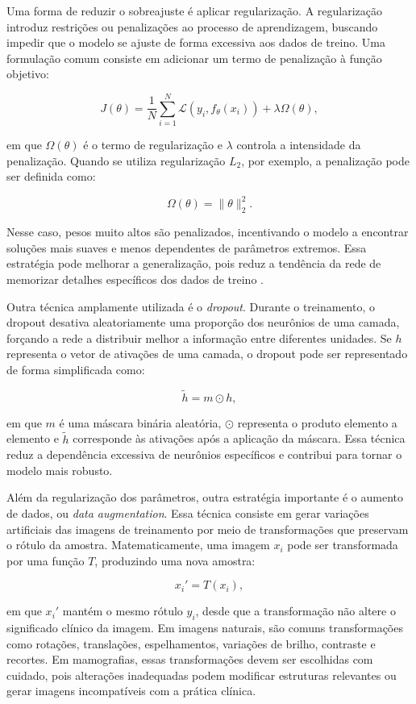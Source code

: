 \documentclass[
    12pt,
    openright,
    oneside,
    a4paper,
    english,
    brazil
]{abntex2}
\begin{document}
Uma forma de reduzir o sobreajuste é aplicar regularização. A regularização introduz restrições ou penalizações ao processo de aprendizagem, buscando impedir que o modelo se ajuste de forma excessiva aos dados de treino. Uma formulação comum consiste em adicionar um termo de penalização à função objetivo:

\[
J(\theta) =
\frac{1}{N}
\sum_{i=1}^{N}
\mathcal{L}(y_i, f_{\theta}(x_i))
+
\lambda \Omega(\theta),
\]

em que \(\Omega(\theta)\) é o termo de regularização e \(\lambda\) controla a intensidade da penalização. Quando se utiliza regularização \(L_2\), por exemplo, a penalização pode ser definida como:

\[
\Omega(\theta) = \|\theta\|_2^2.
\]

Nesse caso, pesos muito altos são penalizados, incentivando o modelo a encontrar soluções mais suaves e menos dependentes de parâmetros extremos. Essa estratégia pode melhorar a generalização, pois reduz a tendência da rede de memorizar detalhes específicos dos dados de treino \cite{goodfellow2016deep}.

Outra técnica amplamente utilizada é o \textit{dropout}. Durante o treinamento, o dropout desativa aleatoriamente uma proporção dos neurônios de uma camada, forçando a rede a distribuir melhor a informação entre diferentes unidades. Se \(h\) representa o vetor de ativações de uma camada, o dropout pode ser representado de forma simplificada como:

\[
\tilde{h} = m \odot h,
\]

em que \(m\) é uma máscara binária aleatória, \(\odot\) representa o produto elemento a elemento e \(\tilde{h}\) corresponde às ativações após a aplicação da máscara. Essa técnica reduz a dependência excessiva de neurônios específicos e contribui para tornar o modelo mais robusto.

Além da regularização dos parâmetros, outra estratégia importante é o aumento de dados, ou \textit{data augmentation}. Essa técnica consiste em gerar variações artificiais das imagens de treinamento por meio de transformações que preservam o rótulo da amostra. Matematicamente, uma imagem \(x_i\) pode ser transformada por uma função \(T\), produzindo uma nova amostra:

\[
x_i' = T(x_i),
\]

em que \(x_i'\) mantém o mesmo rótulo \(y_i\), desde que a transformação não altere o significado clínico da imagem. Em imagens naturais, são comuns transformações como rotações, translações, espelhamentos, variações de brilho, contraste e recortes. Em mamografias, essas transformações devem ser escolhidas com cuidado, pois alterações inadequadas podem modificar estruturas relevantes ou gerar imagens incompatíveis com a prática clínica.
\end{document}
